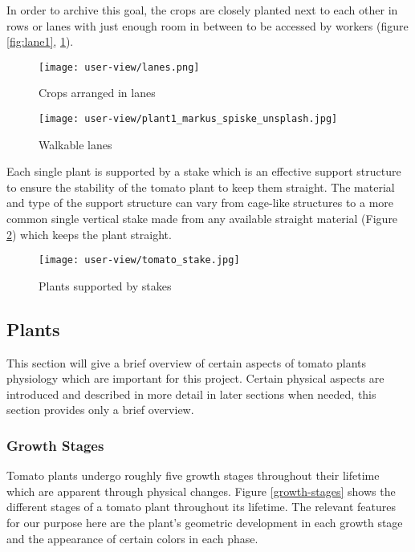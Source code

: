 In order to archive this goal, the crops are closely planted next to each other in rows
or lanes with just enough room in between to be accessed by workers (figure \ref{fig:lane1}, \ref{fig:lane2}).

\begin{figure}[H]
    \centering
    \begin{minipage}[b]{0.47\textwidth}
        \texttt{[image: user-view/lanes.png]}
        \caption{Crops arranged in lanes}
        \label{fig:lane1}
    \end{minipage}
    \hfill
    \begin{minipage}[b]{0.49\textwidth}
        \texttt{[image: user-view/plant1\_markus\_spiske\_unsplash.jpg]}
        \caption{Walkable lanes}
        \label{fig:lane2}
    \end{minipage}
\end{figure}

Each single plant is supported by a stake which is an effective support structure to ensure
the stability of the tomato plant to keep them straight.
The material and type of the support structure can vary from cage-like structures
to a more common single vertical stake made from any available straight material (Figure \ref{fig:stake})
which keeps the plant straight.

\begin{figure}[H]
    \centering
    \texttt{[image: user-view/tomato\_stake.jpg]}
    \caption{Plants supported by stakes}
    \label{fig:stake}
\end{figure}

\subsection{Plants}\label{subsec:plants}

This section will give a brief overview of certain aspects of tomato plants physiology
which are important for this project.
Certain physical aspects are introduced and described in more detail in later sections when needed, this
section provides only a brief overview.

\subsubsection*{Growth Stages}\label{sec:growth-stages}

Tomato plants undergo roughly five growth stages throughout their lifetime which are apparent through
physical changes.
Figure \ref{growth-stages} shows the different stages of a tomato plant throughout its lifetime.
The relevant features for our purpose here are the plant's geometric development in each growth stage
and the appearance of certain colors in each phase.

